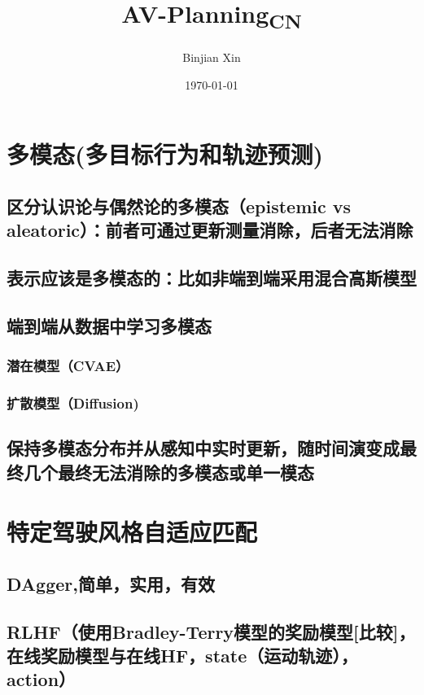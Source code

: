 \documentclass[11pt]{article}
\author{Binjian Xin}
\date{\today}
\title{AV-Planning\textsubscript{CN}}
\begin{document}
\maketitle
\section*{多模态(多目标行为和轨迹预测)}
\label{sec:orge4fac1d}
\subsection*{区分认识论与偶然论的多模态（epistemic vs aleatoric）：前者可通过更新测量消除，后者无法消除}
\label{sec:org15b9d10}
\subsection*{表示应该是多模态的：比如非端到端采用混合高斯模型}
\label{sec:org00b743d}
\subsection*{端到端从数据中学习多模态}
\label{sec:org35f170f}
\subsubsection*{潜在模型（CVAE）}
\label{sec:orgc62f135}
\subsubsection*{扩散模型（Diffusion)}
\label{sec:org796b078}
\subsection*{保持多模态分布并从感知中实时更新，随时间演变成最终几个最终无法消除的多模态或单一模态}
\label{sec:org1e6cb4b}
\section*{特定驾驶风格自适应匹配}
\label{sec:org1689ca5}
\subsection*{DAgger,简单，实用，有效}
\label{sec:orgba4630b}
\subsection*{RLHF（使用Bradley-Terry模型的奖励模型[比较]，在线奖励模型与在线HF，state（运动轨迹），action）}
\label{sec:orgafa9095}
\end{document}
